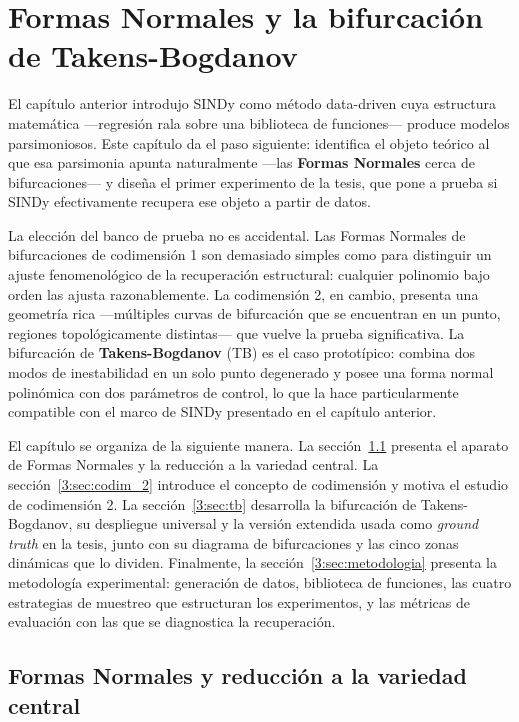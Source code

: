 \chapter{\textbf{Formas Normales y la bifurcación de Takens-Bogdanov}}
\label{3:cap:formas_normales_tb}

El capítulo anterior introdujo SINDy como método data-driven cuya estructura matemática —regresión rala sobre una biblioteca de funciones— produce modelos parsimoniosos. Este capítulo da el paso siguiente: identifica el objeto teórico al que esa parsimonia apunta naturalmente —las \textbf{Formas Normales} cerca de bifurcaciones— y diseña el primer experimento de la tesis, que pone a prueba si SINDy efectivamente recupera ese objeto a partir de datos.

La elección del banco de prueba no es accidental. Las Formas Normales de bifurcaciones de codimensión 1 son demasiado simples como para distinguir un ajuste fenomenológico de la recuperación estructural: cualquier polinomio bajo orden las ajusta razonablemente. La codimensión 2, en cambio, presenta una geometría rica —múltiples curvas de bifurcación que se encuentran en un punto, regiones topológicamente distintas— que vuelve la prueba significativa. La bifurcación de \textbf{Takens-Bogdanov} (TB) es el caso prototípico: combina dos modos de inestabilidad en un solo punto degenerado y posee una forma normal polinómica con dos parámetros de control, lo que la hace particularmente compatible con el marco de SINDy presentado en el capítulo anterior.

El capítulo se organiza de la siguiente manera. La sección~\ref{3:sec:formas_normales} presenta el aparato de Formas Normales y la reducción a la variedad central. La sección~\ref{3:sec:codim_2} introduce el concepto de codimensión y motiva el estudio de codimensión 2. La sección~\ref{3:sec:tb} desarrolla la bifurcación de Takens-Bogdanov, su despliegue universal y la versión extendida usada como \textit{ground truth} en la tesis, junto con su diagrama de bifurcaciones y las cinco zonas dinámicas que lo dividen. Finalmente, la sección~\ref{3:sec:metodologia} presenta la metodología experimental: generación de datos, biblioteca de funciones, las cuatro estrategias de muestreo que estructuran los experimentos, y las métricas de evaluación con las que se diagnostica la recuperación.

\section{Formas Normales y reducción a la variedad central}
\label{3:sec:formas_normales}

